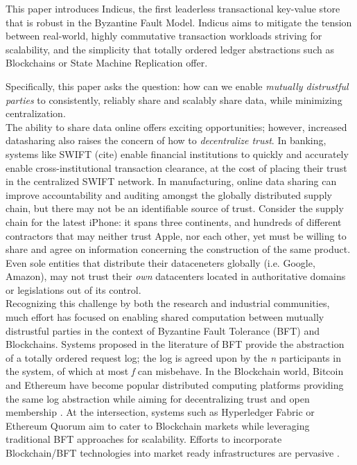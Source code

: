 


This paper introduces Indicus, the first leaderless transactional key-value store that is robust in the Byzantine Fault Model. Indicus aims to mitigate the tension between real-world, highly commutative transaction workloads striving for scalability, and the simplicity that totally ordered ledger abstractions such as Blockchains or State Machine Replication offer.

 Specifically, this paper asks the question: how can we enable \textit{mutually distrustful parties} to consistently, reliably share and scalably share data, while minimizing centralization. \\


The ability to share data online offers exciting opportunities; however, increased datasharing also raises the concern of how to \textit{decentralize trust}. In banking, systems like SWIFT (cite) enable financial institutions to quickly and accurately enable cross-institutional transaction clearance, at the cost of placing their trust in the centralized SWIFT network. In manufacturing, online data sharing can improve accountability and auditing amongst the globally distributed supply chain, but there may not be an identifiable source of trust. Consider the supply chain for the latest iPhone: it spans three continents, and hundreds of different contractors \cite{AppleSup} that may neither trust Apple, nor each other, yet must be willing to share and agree on information concerning the construction of the same product. Even sole entities that distribute their dataceneters globally (i.e. Google, Amazon), may not trust their \textit{own} datacenters located in authoritative domains or legislations out of its control.\\


Recognizing this challenge by both the research and industrial communities, much effort has focused on enabling shared computation  between mutually distrustful parties in the context of Byzantine Fault Tolerance (BFT) and Blockchains. 
Systems proposed in the literature of BFT provide the abstraction of a totally ordered request log; the log is agreed upon by the \textit{n} participants in the system, of which at most \textit{f} can misbehave. In the Blockchain world, Bitcoin and Ethereum have become popular distributed computing platforms providing the same log abstraction while aiming for decentralizing trust and open membership . At the intersection, systems such as Hyperledger Fabric \cite{Hyperledger} or Ethereum Quorum \cite{EthereumQuorum} aim to cater to Blockchain markets while leveraging traditional BFT approaches for scalability. Efforts to incorporate Blockchain/BFT technologies into market ready infrastructures are pervasive \cite{StateFarmQuorum, AutoInventory, StateFarmQuorum2, HyperledgerTelecom, HyperledgerHealth}. \\


